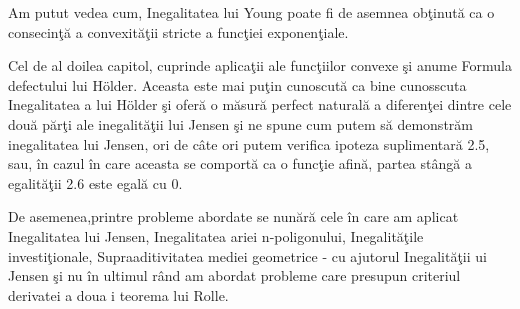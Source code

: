 \documentclass[a4paper,12pt,oneside]{report}
\begin{document}
 Am putut vedea cum, Inegalitatea lui Young poate fi de asemnea ob\c{t}inut\u{a} ca o consecin\c{t}\u{a} a convexit\u{a}\c{t}ii stricte a func\c{t}iei exponen\c{t}iale. 
 
Cel de al doilea capitol, cuprinde aplica\c{t}ii ale func\c{t}iilor convexe \c{s}i anume Formula defectului lui Hölder. Aceasta este mai pu\c{t}in cunoscut\u{a} ca bine cunosscuta Inegalitatea a lui Hölder \c{s}i ofer\u{a} o m\u{a}sur\u{a} perfect natural\u{a} a diferen\c{t}ei dintre cele dou\u{a} p\u{a}r\c{t}i ale inegalit\u{a}\c{t}ii lui Jensen \c{s}i ne spune cum putem s\u{a} demonstr\u{a}m inegalitatea lui Jensen, ori de c\^{a}te ori putem verifica ipoteza suplimentar\u{a} 2.5, sau, \^{i}n cazul \^{i}n care aceasta se comport\u{a} ca o func\c{t}ie afin\u{a}, partea st\^{a}ng\u{a} a egalit\u{a}\c{t}ii 2.6 este egal\u{a} cu 0. 

De asemenea,printre probleme abordate se nun\u{a}r\u{a} cele \^{i}n care am aplicat  Inegalitatea lui Jensen, Inegalitatea ariei n-poligonului, Inegalit\u{a}\c{t}ile investi\c{t}ionale, Supraaditivitatea mediei geometrice - cu ajutorul Inegalit\u{a}\c{t}ii ui Jensen \c{s}i nu \^{i}n ultimul r\^{a}nd am abordat probleme care presupun criteriul derivatei a doua i teorema lui Rolle. 








\setlength{\baselineskip}{\normalbaselineskip}
\setlength{\parskip}{0pt}

\end{document}

